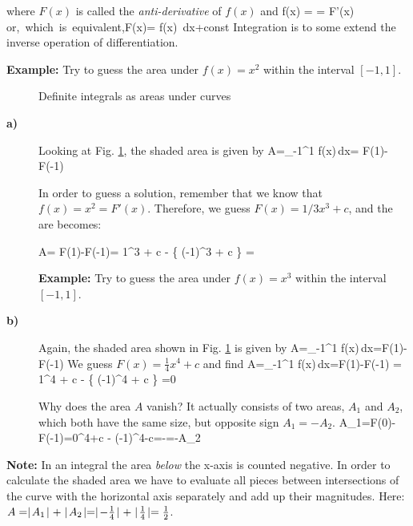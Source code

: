 where $F(x)$ is called the {\em anti-derivative} of $f(x)$ and
\bnn f(x) =  = F'(x) \qquad\mbox{or, which is equivalent,}\qquad F(x)=\int \: f(x)\, dx+\mbox{const} \enn
Integration is to some extend the inverse operation of differentiation. \vs

{\bf Example:} Try to guess the area under $f(x)=x^2$ within the interval $[-1,1]$.

\svs\begin{figure}[!h]
    \centering
    \hspace*{0.5cm}
     \svs
    \caption{Definite integrals as areas under curves}  \label{fig24}
\end{figure} \svs

\begin{description}
\item[{\bf a)}]
Looking at Fig. \ref{fig24}, the shaded area is given by
\bnn A=\int_{-1}^1 f(x)\,dx= F(1)-F(-1) \enn

In order to guess a solution, remember that we know that $f(x)=x^2=F'(x)$. Therefore, we guess $F(x)=1/3x^3+c$, and the are becomes:

\bnn A= F(1)-F(-1)= 1^3 + c - \{  (-1)^3 + c \} =  \enn \vs

{\bf Example:} Try to guess the area under $f(x)=x^3$ within the interval $[-1,1]$.

\item[{\bf b)}]
Again, the shaded area shown in Fig. \ref{fig24} is given by
\bnn A=\int_{-1}^1 f(x)\,dx=F(1)-F(-1)\enn
We guess $F(x)=\frac{1}{4}x^4+c$ and find
\bnn A=\int_{-1}^1 f(x)\,dx=F(1)-F(-1) = 1^4 + c - \{  (-1)^4 + c \} =0 \enn

Why does the area $A$ vanish? It actually consists of two areas, $A_1$ and $A_2$, which both have
the same size, but opposite sign $A_1=-A_2$.
\bnn A_1=F(0)-F(-1)=0^4+c - (-1)^4-c=-=-A_2 \enn
\end{description}

{\bf Note:} In an integral the area {\em below} the x-axis is counted negative. In order to calculate the shaded area
we have to evaluate all pieces between intersections of the curve with the horizontal axis separately and add up their
magnitudes. Here: $A=\abs{A_1}+\abs{A_2}=\abs{-\frac{1}{4}}+\abs{\frac{1}{4}}=\frac{1}{2}$. \vs

